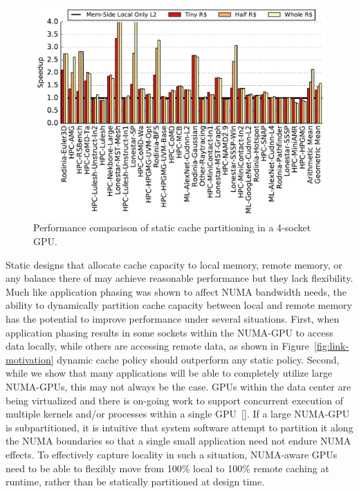\begin{figure}[t]
    \centering
    \includegraphics[width=1.0\columnwidth]{figures/plot_static_cache_WB.pdf}
    \caption{Performance comparison of static cache partitioning in a 4-socket GPU.}
    \label{fig:staticcaching}
\end{figure}

Static designs that allocate cache capacity to local memory, remote memory, or any
balance there of may achieve reasonable performance but they lack flexibility.  Much
like application phasing was shown to affect NUMA bandwidth needs, the ability to
dynamically partition cache capacity between local and remote memory has the potential
to improve performance under several situations.  First, when application phasing
results in some sockets within the NUMA-GPU to access data locally, while others
are accessing remote data, as shown in Figure~\ref{fig:link-motivation} dynamic
cache policy should outperform any static policy.  Second, while we show that many
applications will be able to completely utilize large NUMA-GPUs, this may not always
be the case.  GPUs within the data center are being virtualized and there is on-going
work to support concurrent execution of multiple kernels and/or processes within a
single GPU~\ref{}. If a large NUMA-GPU is subpartitioned, it is intuitive that system
software attempt to partition it along the NUMA boundaries so that a single small
application need not endure NUMA effects.  To effectively capture locality in such
a situation, NUMA-aware GPUs need to be able to flexibly move from 100\% local to
100\% remote caching at runtime, rather than be statically partitioned at design time.

